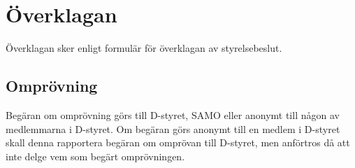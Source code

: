 \documentclass[a4paper]{dtek}
\begin{document}
\section{Överklagan}
Överklagan sker enligt formulär för överklagan av styrelsebeslut.
\subsection{Omprövning}
  Begäran om omprövning görs till D-styret, SAMO eller anonymt till någon av medlemmarna i D-styret. Om begäran görs anonymt till en medlem i D-styret skall denna rapportera begäran om omprövan till D-styret, men anförtros då att inte delge vem som begärt omprövningen.
\end{document}
